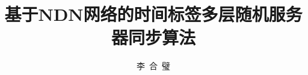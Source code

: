 ﻿\documentclass[bachelor,euler,twoside,openright]{ustcthesis}
\title{基于NDN网络的时间标签多层随机服务器同步算法}%
\author{李\ 合\ 璧}
\begin{document}
  \maketitle

\frontmatter
\makeatletter
\ifustc@bachelor
	

	\tableofcontents


\else
	\tableofcontents

	\ustclot
	\ustclof
	\ustcloa

\fi
\makeatother

\mainmatter

  
  
  
  
  
  

\backmatter

  
  \nocite{*} %


  \makeatletter
  \ifustc@bachelor\relax\else
    
  \fi
  \makeatother
\end{document}

